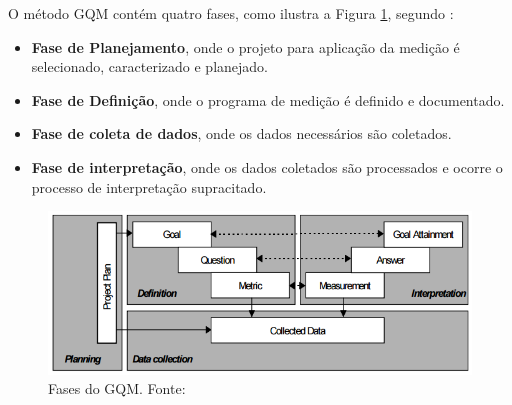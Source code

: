     O método GQM contém quatro fases, como ilustra a Figura \ref{gqm_phases}, segundo :
    
    \begin{itemize}
     
     \item \textbf{Fase de Planejamento}, onde o projeto para aplicação da medição é selecionado, caracterizado e planejado.
     
     \item \textbf{Fase de Definição}, onde o programa de medição é definido e documentado.
     
     \item \textbf{Fase de coleta de dados}, onde os dados necessários são coletados.
     
     \item \textbf{Fase de interpretação}, onde os dados coletados são processados e ocorre o processo de interpretação supracitado.
     
    \end{itemize}
  
    \begin{figure}[!htb]
      \centering
      \includegraphics[scale=0.5]{figuras/gqm_phases}
      \caption[Fases do GQM.]
	      {Fases do GQM. Fonte: \cite{solingen99}}
      \label{gqm_phases}
    \end{figure}